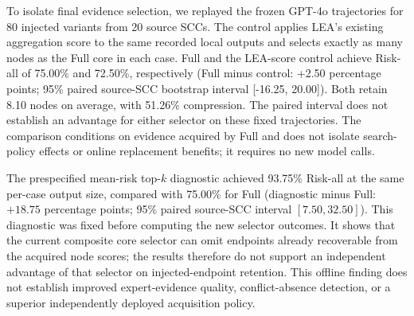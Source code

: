 To isolate final evidence selection, we replayed the frozen GPT-4o trajectories for 80 injected variants from 20 source SCCs. The control applies LEA's existing aggregation score to the same recorded local outputs and selects exactly as many nodes as the Full core in each case. Full and the LEA-score control achieve Risk-all of 75.00\% and 72.50\%, respectively (Full minus control: +2.50 percentage points; 95\% paired source-SCC bootstrap interval [-16.25, 20.00]). Both retain 8.10 nodes on average, with 51.26\% compression. The paired interval does not establish an advantage for either selector on these fixed trajectories. The comparison conditions on evidence acquired by Full and does not isolate search-policy effects or online replacement benefits; it requires no new model calls.

The prespecified mean-risk top-$k$ diagnostic achieved 93.75\% Risk-all at the same per-case output size, compared with 75.00\% for Full (diagnostic minus Full: $+18.75$ percentage points; 95\% paired source-SCC interval $[7.50,32.50]$). This diagnostic was fixed before computing the new selector outcomes. It shows that the current composite core selector can omit endpoints already recoverable from the acquired node scores; the results therefore do not support an independent advantage of that selector on injected-endpoint retention. This offline finding does not establish improved expert-evidence quality, conflict-absence detection, or a superior independently deployed acquisition policy.
